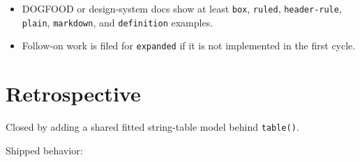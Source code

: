 \begin{itemize}
  \texttt{a\allowbreak{}c\allowbreak{}c\allowbreak{}e\allowbreak{}s\allowbreak{}s\allowbreak{}i\allowbreak{}b\allowbreak{}l\allowbreak{}e} mode preserves semantic row/header/value reading order.
\item
  DOGFOOD or design-system docs show at least \texttt{b\allowbreak{}o\allowbreak{}x}, \texttt{r\allowbreak{}u\allowbreak{}l\allowbreak{}e\allowbreak{}d}, \texttt{h\allowbreak{}e\allowbreak{}a\allowbreak{}d\allowbreak{}e\allowbreak{}r\allowbreak{}-\allowbreak{}r\allowbreak{}u\allowbreak{}l\allowbreak{}e}, \texttt{p\allowbreak{}l\allowbreak{}a\allowbreak{}i\allowbreak{}n}, \texttt{m\allowbreak{}a\allowbreak{}r\allowbreak{}k\allowbreak{}d\allowbreak{}o\allowbreak{}w\allowbreak{}n}, and \texttt{d\allowbreak{}e\allowbreak{}f\allowbreak{}i\allowbreak{}n\allowbreak{}i\allowbreak{}t\allowbreak{}i\allowbreak{}o\allowbreak{}n} examples.
\item
  Follow-on work is filed for \texttt{e\allowbreak{}x\allowbreak{}p\allowbreak{}a\allowbreak{}n\allowbreak{}d\allowbreak{}e\allowbreak{}d} if it is not implemented in the first cycle.
\end{itemize}

\section{Retrospective}\label{record-133-retrospective}

Closed by adding a shared fitted string-table model behind \texttt{t\allowbreak{}a\allowbreak{}b\allowbreak{}l\allowbreak{}e\allowbreak{}(\allowbreak{})}.

Shipped behavior:

